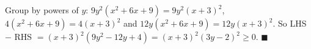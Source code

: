 Group by powers of $y$: $9y^2(x^2+6x+9)=9y^2(x+3)^2$, $4(x^2+6x+9)=4(x+3)^2$ and $12y(x^2+6x+9)=12y(x+3)^2$. So LHS $-$ RHS $=(x+3)^2(9y^2-12y+4)=(x+3)^2(3y-2)^2\ge0$. $\blacksquare$
